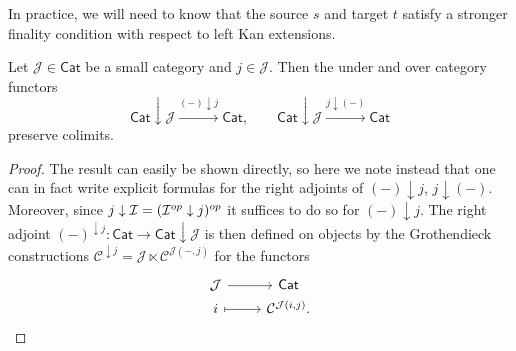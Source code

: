 \documentclass[a4paper,10pt]{article}%
\begin{document}
In practice, we will need to know that the source $s$ and target $t$ satisfy a stronger finality condition with respect to left Kan extensions.


\begin{lemma}\label{UNDERLEFTADJ LEM}
Let $\mathcal{J} \in \mathsf{Cat}$ be a small category and 
$j \in \mathcal{J}$. 
Then the under and over category functors
\[
	\mathsf{Cat} \downarrow \mathcal{J}
		\xrightarrow{(\minus) \downarrow j}
	\mathsf{Cat},
\qquad
	\mathsf{Cat} \downarrow \mathcal{J}
		\xrightarrow{j \downarrow (\minus)}
	\mathsf{Cat}
\]
preserve colimits.
\end{lemma}

\begin{proof}
The result can easily be shown directly,
so here we note instead that one can in fact
 write explicit formulas for the right adjoints
of
$(\minus) \downarrow j$,
$j \downarrow (\minus)$.
Moreover, since $j \downarrow \mathcal{I} = (\mathcal{I}^{op} \downarrow j)^{op}$ 
it suffices to do so for $(\minus) \downarrow j$.
The right adjoint
$(\minus)^{\downarrow j} \colon
\mathsf{Cat}
	\to 
\mathsf{Cat} \downarrow \mathcal{J}
$
is then defined on objects by the Grothendieck constructions
$\mathcal{C}^{\downarrow j}
= \mathcal{J} \ltimes \mathcal{C}^{\mathcal{J}(\minus,j)}$
for the functors
\[
\begin{tikzcd}[row sep = 0em]
	\mathcal{J} \ar{r} & \mathsf{Cat} \\
	i \ar[mapsto]{r} & \C^{\mathcal{J}(i,j)}.
\end{tikzcd}
\]
\end{proof}
%
%	
%
\end{document}
